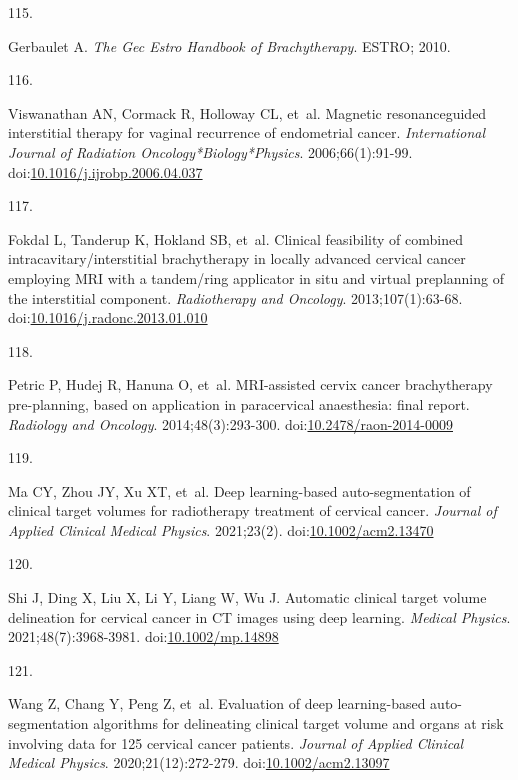 \documentclass[
  a4paper,
]{scrreprt}
\newlength{\cslhangindent}
\newlength{\csllabelwidth}
\newlength{\cslentryspacingunit} %
\newenvironment{CSLReferences}[2] %
 {%
  \setlength{\parindent}{0pt}
  \ifodd #1
  \let\oldpar\par
  \def\par{\hangindent=\cslhangindent\oldpar}
  \fi
  \setlength{\parskip}{#2\cslentryspacingunit}
 }%
 {}
\newcommand{\CSLLeftMargin}[1]{\parbox[t]{\csllabelwidth}{#1}}
\newcommand{\CSLRightInline}[1]{\parbox[t]{\linewidth - \csllabelwidth}{#1}\break}
\begin{document}
\begin{CSLReferences}{0}{0}
\leavevmode{}%
\CSLLeftMargin{115. }%
\CSLRightInline{Gerbaulet A. \emph{The Gec Estro Handbook of
Brachytherapy}. {ESTRO}; 2010.}

\leavevmode{}%
\CSLLeftMargin{116. }%
\CSLRightInline{Viswanathan AN, Cormack R, Holloway CL, et~al. Magnetic
resonance{\textendash}guided interstitial therapy for vaginal recurrence
of endometrial cancer. \emph{International Journal of Radiation
Oncology*Biology*Physics}. 2006;66(1):91-99.
doi:\href{https://doi.org/10.1016/j.ijrobp.2006.04.037}{10.1016/j.ijrobp.2006.04.037}}

\leavevmode{}%
\CSLLeftMargin{117. }%
\CSLRightInline{Fokdal L, Tanderup K, Hokland SB, et~al. Clinical
feasibility of combined intracavitary/interstitial brachytherapy in
locally advanced cervical cancer employing MRI with a tandem/ring
applicator in situ and virtual preplanning of the interstitial
component. \emph{Radiotherapy and Oncology}. 2013;107(1):63-68.
doi:\href{https://doi.org/10.1016/j.radonc.2013.01.010}{10.1016/j.radonc.2013.01.010}}

\leavevmode{}%
\CSLLeftMargin{118. }%
\CSLRightInline{Petric P, Hudej R, Hanuna O, et~al. MRI-assisted cervix
cancer brachytherapy pre-planning, based on application in paracervical
anaesthesia: final report. \emph{Radiology and Oncology}.
2014;48(3):293-300.
doi:\href{https://doi.org/10.2478/raon-2014-0009}{10.2478/raon-2014-0009}}

\leavevmode{}%
\CSLLeftMargin{119. }%
\CSLRightInline{Ma CY, Zhou JY, Xu XT, et~al. Deep learning{-}based
auto{-}segmentation of clinical target volumes for radiotherapy
treatment of cervical cancer. \emph{Journal of Applied Clinical Medical
Physics}. 2021;23(2).
doi:\href{https://doi.org/10.1002/acm2.13470}{10.1002/acm2.13470}}

\leavevmode{}%
\CSLLeftMargin{120. }%
\CSLRightInline{Shi J, Ding X, Liu X, Li Y, Liang W, Wu J. Automatic
clinical target volume delineation for cervical cancer in CT images
using deep learning. \emph{Medical Physics}. 2021;48(7):3968-3981.
doi:\href{https://doi.org/10.1002/mp.14898}{10.1002/mp.14898}}

\leavevmode{}%
\CSLLeftMargin{121. }%
\CSLRightInline{Wang Z, Chang Y, Peng Z, et~al. Evaluation of deep
learning{-}based auto{-}segmentation algorithms for delineating clinical
target volume and organs at risk involving data for 125 cervical cancer
patients. \emph{Journal of Applied Clinical Medical Physics}.
2020;21(12):272-279.
doi:\href{https://doi.org/10.1002/acm2.13097}{10.1002/acm2.13097}}


\end{CSLReferences}
\end{document}
